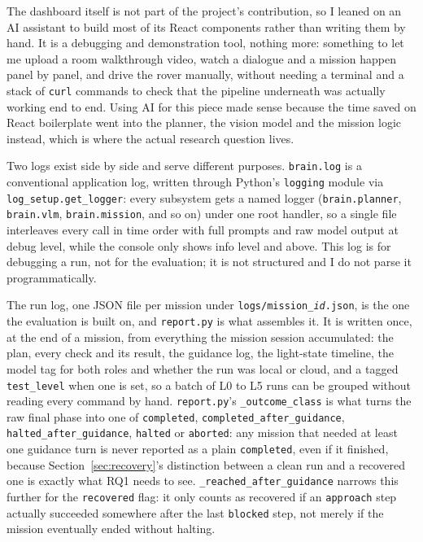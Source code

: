 The dashboard itself is not part of the project's contribution, so I leaned on
an AI assistant to build most of its React components rather than writing them
by hand. It is a debugging and demonstration tool, nothing more: something to
let me upload a room walkthrough video, watch a dialogue and a mission happen
panel by panel, and drive the rover manually, without needing a terminal and a
stack of \texttt{curl} commands to check that the pipeline underneath was
actually working end to end. Using AI for this piece made sense because the
time saved on React boilerplate went into the planner, the vision model and
the mission logic instead, which is where the actual research question lives.

\label{sec:logging}

Two logs exist side by side and serve different purposes. \texttt{brain.log} is
a conventional application log, written through Python's \texttt{logging} module
via \texttt{log\_setup.get\_logger}: every subsystem gets a named logger
(\texttt{brain.planner}, \texttt{brain.vlm}, \texttt{brain.mission}, and so on)
under one root handler, so a single file interleaves every call in time order
with full prompts and raw model output at debug level, while the console only
shows info level and above. This log is for debugging a run, not for the
evaluation; it is not structured and I do not parse it programmatically.

The run log, one JSON file per mission under \texttt{logs/mission\_\textit{id}.json},
is the one the evaluation is built on, and \texttt{report.py} is what assembles
it. It is written once, at the end of a mission, from everything the mission
session accumulated: the plan, every check and its result, the guidance log,
the light-state timeline, the model tag for both roles and whether the run
was local or cloud, and a tagged \texttt{test\_level} when one is set, so a
batch of L0 to L5 runs can be grouped without reading every command by hand.
\texttt{report.py}'s \texttt{\_outcome\_class} is what turns the raw final
phase into one of \texttt{completed}, \texttt{completed\_after\_guidance},
\texttt{halted\_after\_guidance}, \texttt{halted} or \texttt{aborted}: any
mission that needed at least one guidance turn is never reported as a plain
\texttt{completed}, even if it finished, because Section~\ref{sec:recovery}'s
distinction between a clean run and a recovered one is exactly what RQ1 needs
to see. \texttt{\_reached\_after\_guidance} narrows this further for the
\texttt{recovered} flag: it only counts as recovered if an \texttt{approach}
step actually succeeded somewhere after the last \texttt{blocked} step, not
merely if the mission eventually ended without halting.

